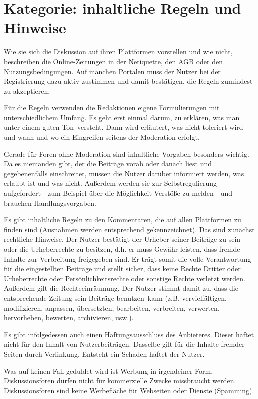 
\section{Kategorie: \glqq inhaltliche Regeln und Hinweise\grqq}

Wie sie sich die Diskussion auf ihren Plattformen vorstellen und wie nicht,
beschreiben die Online-Zeitungen in der Netiquette, den AGB oder den
Nutzungsbedingungen. Auf manchen Portalen muss der Nutzer bei der Registrierung
dazu aktiv zustimmen und damit bestätigen, die Regeln zumindest zu akzeptieren.

Für die Regeln verwenden die Redaktionen eigene Formulierungen mit
unterschiedlichem Umfang. Es geht erst einmal darum, zu erklären, was man unter
einem \glqq guten Ton\grqq\ versteht. Dann wird erläutert, was nicht toleriert
wird und wann und wo ein Eingreifen seitens der Moderation erfolgt.

Gerade für Foren ohne Moderation sind inhaltliche Vorgaben besonders wichtig. Da
es niemanden gibt, der die Beiträge vorab oder danach liest und gegebenenfalls
einschreitet, müssen die Nutzer darüber informiert werden, was erlaubt ist und
was nicht. Außerdem werden sie zur Selbstregulierung aufgefordert - zum Beispiel
über die Möglichkeit Verstöße zu melden - und brauchen Handlungsvorgaben.

Es gibt inhaltliche Regeln zu den Kommentaren, die auf allen Plattformen zu
finden sind (Ausnahmen werden entsprechend gekennzeichnet).  Das sind zunächst
rechtliche Hinweise. Der Nutzer bestätigt der Urheber seiner Beiträge zu sein
oder die Urheberrechte zu besitzen, d.h. er muss Gewähr leisten, dass fremde
Inhalte zur Verbreitung freigegeben sind. Er trägt somit die volle Verantwortung
für die eingestellten Beiträge und stellt sicher, dass keine Rechte Dritter oder
Urheberrechte oder Persönlichkeitsrechte oder sonstige Rechte verletzt werden.
Außerdem gilt die Rechteeinräumung. Der Nutzer stimmt damit zu, dass die
entsprechende Zeitung sein Beiträge \glqq benutzen\grqq\ kann (z.B. vervielfältigen,
modifizieren, anpassen, übersetzten, bearbeiten, verbreiten, verwerten,
hervorheben, bewerten, archivieren, usw.).

Es gibt infolgedessen auch einen Haftungsausschluss des Anbieteres. Dieser
haftet nicht für den Inhalt von Nutzerbeiträgen. Dasselbe gilt für die Inhalte
fremder Seiten durch Verlinkung. Entsteht ein Schaden haftet der Nutzer.

Was auf keinen Fall geduldet wird ist Werbung in irgendeiner Form.
Diskussionsforen dürfen nicht für kommerzielle Zwecke missbraucht werden.
Diskussionsforen sind keine Werbefläche für Webseiten oder Dienste (Spamming).

